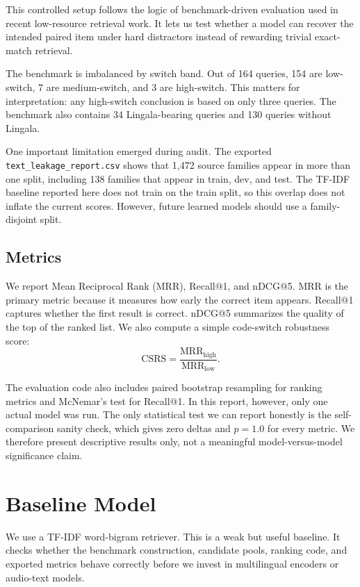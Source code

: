 \documentclass[11pt,twocolumn]{article}
\begin{document}
This controlled setup follows the logic of benchmark-driven evaluation used in recent low-resource retrieval work. It lets us test whether a model can recover the intended paired item under hard distractors instead of rewarding trivial exact-match retrieval.

The benchmark is imbalanced by switch band. Out of 164 queries, 154 are low-switch, 7 are medium-switch, and 3 are high-switch. This matters for interpretation: any high-switch conclusion is based on only three queries. The benchmark also contains 34 Lingala-bearing queries and 130 queries without Lingala.

One important limitation emerged during audit. The exported \texttt{text\_leakage\_report.csv} shows that 1{,}472 source families appear in more than one split, including 138 families that appear in train, dev, and test. The TF-IDF baseline reported here does not train on the train split, so this overlap does not inflate the current scores. However, future learned models should use a family-disjoint split.

\subsection{Metrics}
We report Mean Reciprocal Rank (MRR), Recall@1, and nDCG@5. MRR is the primary metric because it measures how early the correct item appears. Recall@1 captures whether the first result is correct. nDCG@5 summarizes the quality of the top of the ranked list. We also compute a simple code-switch robustness score:
\begin{equation}
\mathrm{CSRS}=\frac{\mathrm{MRR}_{\mathrm{high}}}{\mathrm{MRR}_{\mathrm{low}}}.
\end{equation}

The evaluation code also includes paired bootstrap resampling for ranking metrics and McNemar's test for Recall@1. In this report, however, only one actual model was run. The only statistical test we can report honestly is the self-comparison sanity check, which gives zero deltas and $p=1.0$ for every metric. We therefore present descriptive results only, not a meaningful model-versus-model significance claim.

\section{Baseline Model}
We use a TF-IDF word-bigram retriever. This is a weak but useful baseline. It checks whether the benchmark construction, candidate pools, ranking code, and exported metrics behave correctly before we invest in multilingual encoders or audio-text models.
\end{document}
